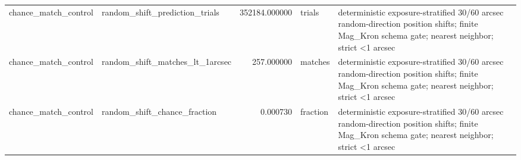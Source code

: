 \begin{tabular}{llrll}
chance\_match\_control & random\_shift\_prediction\_trials & 352184.000000 & trials & deterministic exposure-stratified 30/60 arcsec random-direction position shifts; finite Mag\_Kron schema gate; nearest neighbor; strict <1 arcsec \\
chance\_match\_control & random\_shift\_matches\_lt\_1arcsec & 257.000000 & matches & deterministic exposure-stratified 30/60 arcsec random-direction position shifts; finite Mag\_Kron schema gate; nearest neighbor; strict <1 arcsec \\
chance\_match\_control & random\_shift\_chance\_fraction & 0.000730 & fraction & deterministic exposure-stratified 30/60 arcsec random-direction position shifts; finite Mag\_Kron schema gate; nearest neighbor; strict <1 arcsec \\
\bottomrule
\end{tabular}

